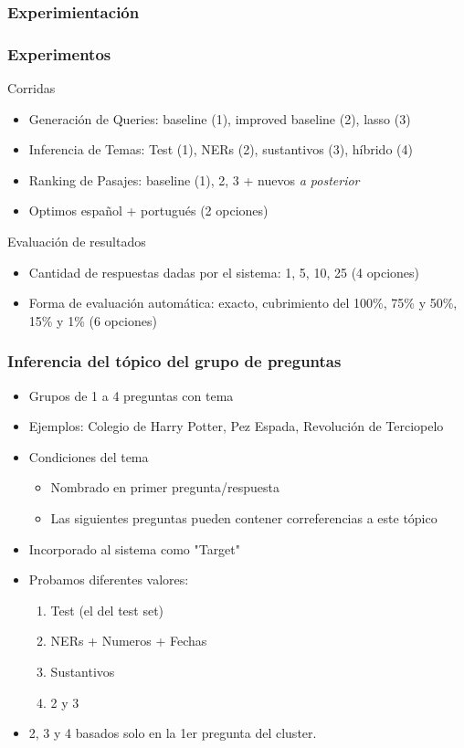 \subsubsection*{Experimientación}
\begin{frame}
\frametitle{Experimentos}
Corridas
\begin{itemize}
  \item Generación de Queries: baseline (1), improved baseline (2), lasso (3) 
  \item Inferencia de Temas: Test (1), NERs (2), sustantivos (3), híbrido (4)
  \item Ranking de Pasajes: baseline (1), 2, 3 + nuevos \textit{a posterior}
  \item Optimos español + portugués (2 opciones)
\end{itemize}
\bigskip
Evaluación de resultados
\begin{itemize}
  \item Cantidad de respuestas dadas por el sistema: 1, 5, 10, 25 (4 opciones)
  \item Forma de evaluación automática: exacto, cubrimiento del 100\%, 75\% y 50\%, 15\%  y 1\% (6 opciones)
\end{itemize}
\end{frame}


\begin{frame}
\frametitle{Inferencia del tópico del grupo de preguntas}
  \begin{itemize}
    \item Grupos de 1 a 4 preguntas con tema
    \item Ejemplos: Colegio de Harry Potter, Pez Espada, Revolución de Terciopelo
    \item Condiciones del tema
    \begin{itemize}
      \item Nombrado en primer pregunta/respuesta
      \item Las siguientes preguntas pueden contener correferencias a este tópico
    \end{itemize}
    \item Incorporado al sistema como "Target"
    \item Probamos diferentes valores:
    \begin{enumerate}
      \item Test (el del test set)
      \item NERs + Numeros + Fechas
      \item Sustantivos
      \item 2 y 3
    \end{enumerate}
    \item 2, 3 y 4 basados solo en la 1er pregunta del cluster.
  \end{itemize}
\end{frame}

